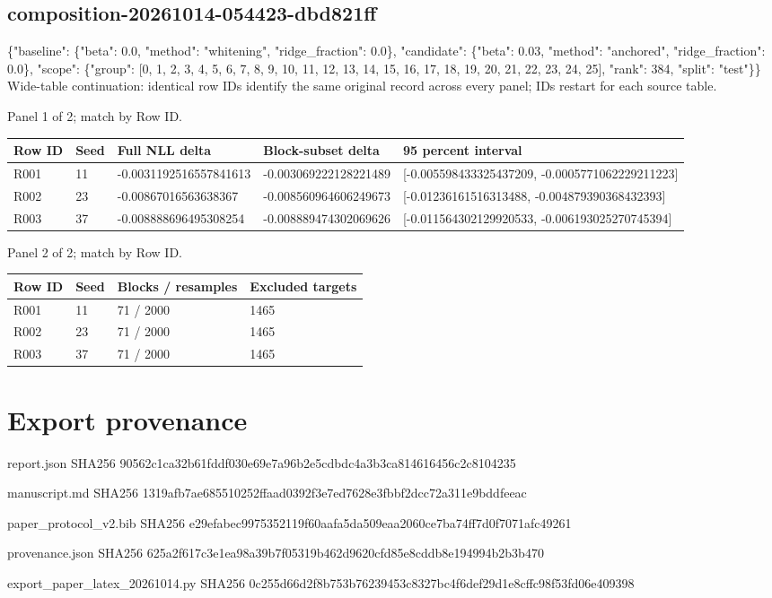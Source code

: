\documentclass[10pt]{article}
\begin{document}
\subsection{composition-20261014-054423-dbd821ff}
\{"baseline": \{"beta": 0.0, "method": "whitening", "ridge\_fraction": 0.0\}, "candidate": \{"beta": 0.03, "method": "anchored", "ridge\_fraction": 0.0\}, "scope": \{"group": [0, 1, 2, 3, 4, 5, 6, 7, 8, 9, 10, 11, 12, 13, 14, 15, 16, 17, 18, 19, 20, 21, 22, 23, 24, 25], "rank": 384, "split": "test"\}\}
Wide-table continuation: identical row IDs identify the same original record across every panel; IDs restart for each source table.
\par\noindent Panel 1 of 2; match by Row ID.
{\scriptsize\setlength{\tabcolsep}{2pt}
\begin{longtable}{p{}p{}p{}p{}p{}}
Row ID & Seed & Full NLL delta & Block-subset delta & 95 percent interval \\
\hline\endhead
R001 & 11 & -0.0031192516557841613 & -0.003069222128221489 & [-0.005598433325437209, -0.0005771062229211223] \\
R002 & 23 & -0.00867016563638367 & -0.008560964606249673 & [-0.01236161516313488, -0.004879390368432393] \\
R003 & 37 & -0.008888696495308254 & -0.008889474302069626 & [-0.011564302129920533, -0.006193025270745394] \\
\end{longtable}}
\par\noindent Panel 2 of 2; match by Row ID.
{\scriptsize\setlength{\tabcolsep}{2pt}
\begin{longtable}{p{}p{}p{}p{}}
Row ID & Seed & Blocks / resamples & Excluded targets \\
\hline\endhead
R001 & 11 & 71 / 2000 & 1465 \\
R002 & 23 & 71 / 2000 & 1465 \\
R003 & 37 & 71 / 2000 & 1465 \\
\end{longtable}}
\section{Export provenance}
\par\noindent\small report.json SHA256 90562c1ca32b61fddf030e69e7a96b2e5cdbdc4a3b3ca814616456c2c8104235
\par\noindent\small manuscript.md SHA256 1319afb7ae685510252ffaad0392f3e7ed7628e3fbbf2dcc72a311e9bddfeeac
\par\noindent\small paper\_protocol\_v2.bib SHA256 e29efabec9975352119f60aafa5da509eaa2060ce7ba74ff7d0f7071afc49261
\par\noindent\small provenance.json SHA256 625a2f617c3e1ea98a39b7f05319b462d9620cfd85e8cddb8e194994b2b3b470
\par\noindent\small export\_paper\_latex\_20261014.py SHA256 0c255d66d2f8b753b76239453c8327bc4f6def29d1e8cffc98f53fd06e409398
\end{document}
